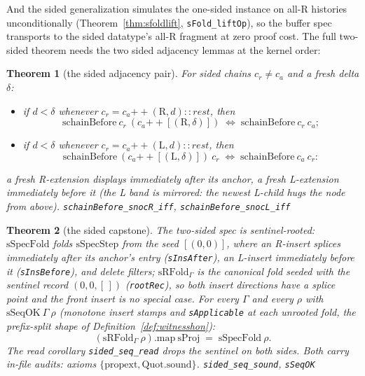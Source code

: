 \documentclass[11pt]{article}
\newtheorem{theorem}{Theorem}[section]
\newcommand{\lean}[1]{\texttt{#1}}
\begin{document}
\noindent And the sided generalization simulates the one-sided
instance on all-R histories unconditionally
(Theorem~\ref{thm:sfoldlift}, \lean{sFold\_liftOp}), so the buffer
spec transports to the sided datatype's all-R fragment at zero proof
cost. The full two-sided theorem needs the two sided adjacency
lemmas at the kernel order:

\begin{theorem}[the sided adjacency pair]
\label{thm:sidedadj}
For sided chains $c_r \ne c_a$ and a fresh delta $\delta$:
\begin{itemize}[leftmargin=2.6em]
\item[(R)] if $d < \delta$ whenever
  $c_r = c_a \mathbin{+\!\!+} (\mathrm{R}, d) :: \mathit{rest}$, then
  \[
    \mathrm{schainBefore}\ c_r\
      (c_a \mathbin{+\!\!+} [(\mathrm{R}, \delta)])
    \;\iff\; \mathrm{schainBefore}\ c_r\ c_a ;
  \]
\item[(L)] if $d < \delta$ whenever
  $c_r = c_a \mathbin{+\!\!+} (\mathrm{L}, d) :: \mathit{rest}$, then
  \[
    \mathrm{schainBefore}\
      (c_a \mathbin{+\!\!+} [(\mathrm{L}, \delta)])\ c_r
    \;\iff\; \mathrm{schainBefore}\ c_a\ c_r :
  \]
\end{itemize}
a fresh R-extension displays immediately after its anchor, a fresh
L-extension immediately before it (the L band is mirrored: the
newest L-child hugs the node from above).
\hfill\lean{schainBefore\_snocR\_iff}, \lean{schainBefore\_snocL\_iff}
\end{theorem}

\begin{theorem}[the sided capstone]
\label{thm:sidedseq}
The two-sided spec is sentinel-rooted: $\mathrm{sSpecFold}$ folds
$\mathrm{sSpecStep}$ from the seed $[(0, 0)]$, where an R-insert
splices immediately after its anchor's entry
(\lean{sInsAfter}), an L-insert immediately before it
(\lean{sInsBefore}), and delete filters; $\mathrm{sRFold}_\Gamma$ is
the canonical fold seeded with the sentinel record $(0, 0, [\,])$
(\lean{rootRec}), so both insert directions have a splice point and
the front insert is no special case. For every $\Gamma$ and every
$\rho$ with $\mathrm{sSeqOK}\ \Gamma\ \rho$ (monotone insert stamps
and \lean{sApplicable} at each unrooted fold, the prefix-split shape
of Definition~\ref{def:witnesshon}):
\[
  (\mathrm{sRFold}_\Gamma\ \rho).\mathrm{map}\ \mathrm{sProj}
  \;=\; \mathrm{sSpecFold}\ \rho .
\]
The read corollary \lean{sided\_seq\_read} drops the sentinel on both
sides. Both carry in-file audits: axioms $\{\mathrm{propext},
\mathrm{Quot.sound}\}$.
\hfill\lean{sided\_seq\_sound}, \lean{sSeqOK}
\end{theorem}
\end{document}
